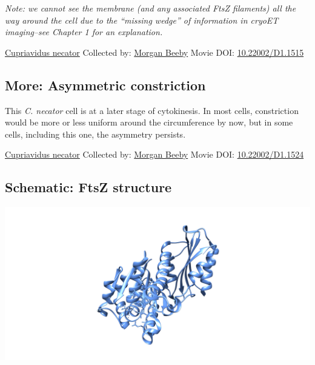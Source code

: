 \documentclass[]{tufte-book}
\begin{document}
\emph{Note: we cannot see the membrane (and any associated FtsZ filaments) all the way around the cell due to the ``missing wedge'' of information in cryoET imaging--see Chapter 1 for an explanation.}



\hypertarget{htmlwidget-26b3d08efafdb1831f82}{}

\label{fig:5-9}\protect\hyperlink{tree}{Cupriavidus necator} Collected by: \protect\hyperlink{morgan_beeby}{Morgan Beeby} Movie DOI: \href{https://doi.org/10.22002/D1.1515}{10.22002/D1.1515}

\hypertarget{Asymmetric_constriction}{%
\subsection*{More: Asymmetric constriction}\label{Asymmetric_constriction}}

This \emph{C. necator} cell is at a later stage of cytokinesis. In most cells, constriction would be more or less uniform around the circumference by now, but in some cells, including this one, the asymmetry persists.



\hypertarget{htmlwidget-a17eedd9fad7d9e0bbff}{}

\label{fig:5-9a}\protect\hyperlink{tree}{Cupriavidus necator} Collected by: \protect\hyperlink{morgan_beeby}{Morgan Beeby} Movie DOI: \href{https://doi.org/10.22002/D1.1524}{10.22002/D1.1524}

\hypertarget{FtsZ_structure}{%
\subsection*{Schematic: FtsZ structure}\label{FtsZ_structure}}

\includegraphics{img/schematics/5_9_1}
\end{document}
